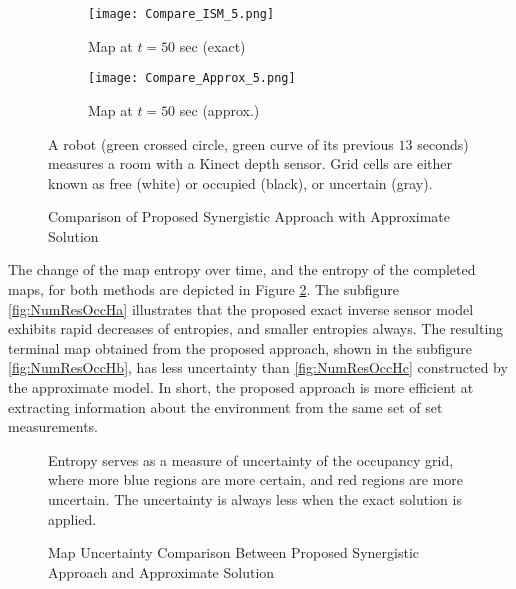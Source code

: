 \begin{figure}
{\begin{subfigure}[t]{0.4\columnwidth}
        \centering
        \texttt{[image: Compare\_ISM\_5.png]}
        \caption{Map at $t=50$ sec (exact)}
    \end{subfigure}
    \hspace*{-0.05\columnwidth}
    \begin{subfigure}[t]{0.4\columnwidth}
        \centering
        \texttt{[image: Compare\_Approx\_5.png]}
        \caption{Map at $t=50$ sec (approx.)}
    \end{subfigure}
    }
    \caption{Comparison of Proposed Synergistic Approach with Approximate Solution}
	\medskip
	\small
	A robot (green crossed circle, green curve of its previous $13$ seconds) measures a room with a Kinect depth sensor. Grid cells are either known as free (white) or occupied (black), or uncertain (gray).
\label{fig:NumResOccProbs}
\end{figure}


The change of the map entropy over time, and the entropy of the completed maps, for both methods are depicted in Figure \ref{fig:NumResOccH}. The subfigure \ref{fig:NumResOccHa} illustrates that the proposed exact inverse sensor model exhibits rapid decreases of entropies, and smaller entropies always. The resulting terminal map obtained from the proposed approach, shown in the subfigure \ref{fig:NumResOccHb}, has less uncertainty than \ref{fig:NumResOccHc} constructed by the approximate model. In short, the proposed approach is more efficient at extracting information about the environment from the same set of set measurements. 


\begin{figure}
    \caption{Map Uncertainty Comparison Between Proposed Synergistic Approach and Approximate Solution}
	\medskip
	\small
	Entropy serves as a measure of uncertainty of the occupancy grid, where more blue regions are more certain, and red regions are more uncertain. The uncertainty is always less when the exact solution is applied.
\label{fig:NumResOccH}
\end{figure}


